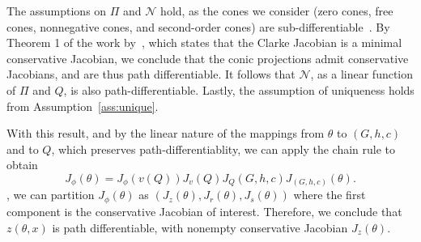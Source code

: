 The assumptions on $\Pi$ and $\mathcal{N}$ hold, as the cones we consider (zero cones, free cones, nonnegative cones, and second-order cones) are sub-differentiable~\citep{cones, cones1}. By Theorem 1 of the work by~\cite{path-diff}, which states that the Clarke Jacobian is a minimal conservative Jacobian, we conclude that the conic projections admit conservative Jacobians, and are thus path differentiable. It follows that $\mathcal{N}$, as a linear function of $\Pi$ and $Q$, is also path-differentiable.  Lastly, the assumption of uniqueness holds from Assumption~\ref{ass:unique}. 

With this result, and by the linear nature of the mappings from $\theta$ to $(G,h,c)$ and to $Q$, which preserves path-differentiablity, we can apply the chain rule to obtain
$$J_\phi(\theta) = J_\phi(v(Q)) J_v(Q) J_Q(G,h,c) J_{(G,h,c)}(\theta).$$
, we can partition $J_\phi(\theta)$ as $(J_{z}(\theta),J_{r}(\theta),J_{s}(\theta))$ where the first component is the conservative Jacobian of interest.  
Therefore, we conclude that $z(\theta,x)$ is path differentiable, with nonempty conservative Jacobian $J_{z}(\theta)$.


